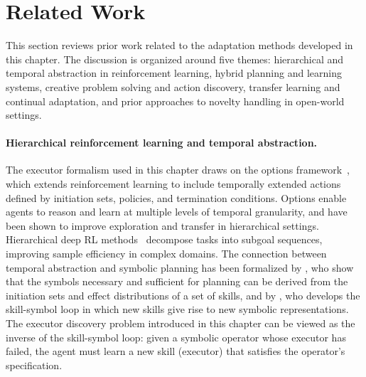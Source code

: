 \section{Related Work}
\label{sec:rl_related_work}

This section reviews prior work related to the adaptation methods developed in this chapter. The discussion is organized around five themes: hierarchical and temporal abstraction in reinforcement learning, hybrid planning and learning systems, creative problem solving and action discovery, transfer learning and continual adaptation, and prior approaches to novelty handling in open-world settings.

\paragraph{Hierarchical reinforcement learning and temporal abstraction.}
The executor formalism used in this chapter draws on the options framework~\citep{sutton1999options}, which extends reinforcement learning to include temporally extended actions defined by initiation sets, policies, and termination conditions. Options enable agents to reason and learn at multiple levels of temporal granularity, and have been shown to improve exploration and transfer in hierarchical settings. Hierarchical deep RL methods~\citep{kulkarni2016hierarchical} decompose tasks into subgoal sequences, improving sample efficiency in complex domains. The connection between temporal abstraction and symbolic planning has been formalized by \citet{konidaris2018skills}, who show that the symbols necessary and sufficient for planning can be derived from the initiation sets and effect distributions of a set of skills, and by \citet{konidaris2016constructing}, who develops the skill-symbol loop in which new skills give rise to new symbolic representations. The executor discovery problem introduced in this chapter can be viewed as the inverse of the skill-symbol loop: given a symbolic operator whose executor has failed, the agent must learn a new skill (executor) that satisfies the operator's specification.

